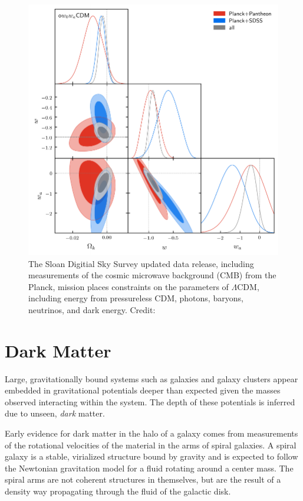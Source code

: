 \documentclass{paper}
\begin{document}
  \begin{figure}[H]
    \begin{centering}
    \includegraphics[scale=0.7]{Intro-constraints.pdf}
    \caption{The Sloan Digitial Sky Survey updated data release, including 
      measurements of the cosmic microwave background (CMB) from the Planck,
      mission places constraints on the parameters of $\Lambda$CDM, including
      energy from pressureless CDM, photons, baryons, neutrinos, and dark
      energy.
    Credit: \cite{2021PhRvD.103h3533A}}
    \label{fig:Intro-constraints}
    \end{centering}
  \end{figure}

\section*{Dark Matter}
  Large, gravitationally bound systems such as galaxies and galaxy clusters 
  appear embedded in gravitational potentials deeper than expected given the 
  masses observed interacting within the system. The depth of these potentials 
  is inferred due to unseen, \textit{dark} matter.

  Early evidence for dark matter in the halo of a galaxy comes from
  measurements of the rotational velocities of the material in the arms of
  spiral galaxies. A spiral galaxy is a stable, virialized structure bound by
  gravity and is expected to follow the Newtonian gravitation model for a
  fluid rotating around a center mass. The spiral arms are not coherent
  structures in themselves, but are the result of a density way propagating 
  through the fluid of the galactic disk. 
\end{document}
